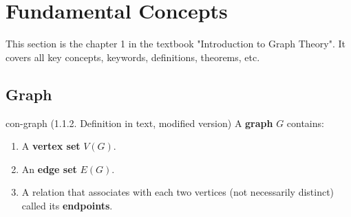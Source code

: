 \documentclass[../src/handouts/main.tex]{subfiles}
\begin{document}

\section{Fundamental Concepts}

\newcommand\bipartitegraphhelper[1]{
  \begin{tikzpicture}[
      point/.style = {circle, fill=black, inner sep=1mm}]
    \def \distance {1.5} %
    \foreach \x in {0,...,3} %
    \foreach \y in {0,...,1} %
    \node[point] (\y\x) at (\x * \distance, \y * - \distance) {};

    \draw (00) -- (10) -- (01) -- (11) -- (03) -- (10);
    \draw (12) -- (02) -- (13);

    \ifthenelse{\isempty{#1}}%
    {}%
    {
      \node at (4 * \distance, 0) {people}
      node at (4 * \distance, - \distance) {jobs};
    }%
  \end{tikzpicture}
}%

\def \bipartitegraph {\bipartitegraphhelper{}}%

\def \bipartitegraphwithlabels {\bipartitegraphhelper{with labels}}%

\def \tripartitegraph {%
  \begin{tikzpicture}[every node/.style = {circle, fill=black, inner sep=1mm}]
    \node (a1) at (-3, 1) {} %
    node (a2) at (-2, 0) {} %
    node (b1) at (-1, 3) {} %
    node (b2) at (0, 3) {} %
    node (b3) at (1, 3) {} %
    node (c1) at (2, 0) {} %
    node (c2) at (3, 1) {}; %
    \draw (b1) -- (a1) -- (b2) -- (a2) -- (c1) -- (b2) -- (c2) -- (b3) -- (c1);
  \end{tikzpicture}
}%

This section is the chapter 1 in the textbook "Introduction to Graph Theory". It covers all key concepts, keywords, definitions, theorems, etc.

\subsection{Graph}

\begin{definition}{}{con-graph}
  (1.1.2. Definition in text, modified version)
  A \textbf{graph} $G$ contains:
  \begin{enumerate}
    \item A \textbf{vertex set} $V(G)$.
    \item An \textbf{edge set} $E(G)$.
    \item A relation that associates with each two vertices (not necessarily distinct) called its \textbf{endpoints}.
  \end{enumerate}
\end{definition}
\end{document}
